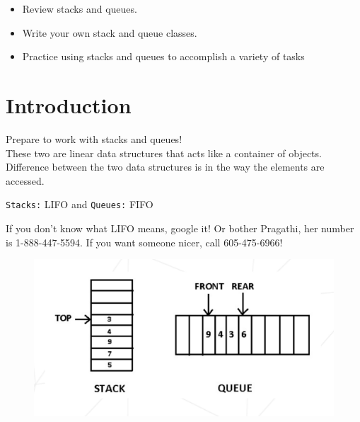 \documentclass{42-en}
\begin{document}
	\begin{itemize}
		\item Review stacks and queues.
		\item Write your own stack and queue classes.
		\item Practice using stacks and queues to accomplish a variety of tasks
	\end{itemize}


\chapter{Introduction}

    Prepare to work with stacks and queues!\\
    These two are linear data structures that acts like a container of objects. 
    Difference between the two data structures is in the way the elements are accessed.

    \texttt{Stacks:} LIFO and \texttt{Queues:} FIFO

    If you don't know what LIFO means, google it! Or bother Pragathi, her number
    is 1-888-447-5594. If you want someone nicer, call 605-475-6966!\\

	           \begin{figure}[H]
		       \begin{center}
			       \includegraphics[width=15cm]{images/intro.png}
			\end{center}
		   \end{figure}
\end{document}
